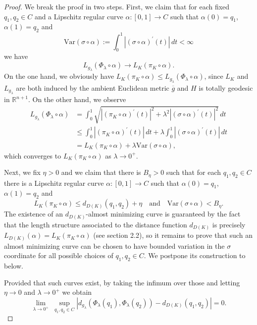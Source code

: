 \documentclass[11pt]{article}
\theoremstyle{definition}
\theoremstyle{remark}
\theoremstyle{plain}
\newcommand{\R}{\mathbb{R}}
\newcommand{\g}{\overline{g}}
\begin{document}
\begin{proof}
  We break the proof in two steps. First, we claim that for each fixed $q_1,q_2\in C$ and a Lipschitz regular curve $\alpha:[0,1]\to C$ such that $\alpha(0)=q_1$, $\alpha(1) = q_2$ and
  $$\mbox{Var}(\sigma\circ \alpha):=\int_0^1|(\sigma\circ \alpha)^\prime(t)|\, dt< \infty$$
  we have 
  $$L_{g_\lambda}(\Phi_\lambda\circ \alpha)\to L_K(\pi_K\circ \alpha).$$
  On the one hand, we obviously have $L_K(\pi_K\circ \alpha)\le L_{g_\lambda}(\Phi_\lambda\circ \alpha)$, since $L_K$ and $L_{g_\lambda}$ are both induced by the ambient Euclidean metric $\g$ and $H$ is totally geodesic in $\R^{n+1}$. On the other hand, we observe
  \begin{equation*}
    \begin{split}
       L_{g_\lambda}(\Phi_\lambda\circ \alpha) & = \int_0^1\sqrt{|(\pi_K\circ \alpha)^\prime(t)|^2 + \lambda^2 |(\sigma\circ \alpha)^\prime(t)|^2}\, dt \\
         & \le \int_0^1|(\pi_K\circ \alpha)^\prime(t)|\, dt + \lambda\int_0^1 |(\sigma\circ \alpha)^\prime(t)|\, dt \\
         & = L_K(\pi_K\circ \alpha) + \lambda\mbox{Var}(\sigma\circ \alpha),
    \end{split}
  \end{equation*}
  which converges to $L_K(\pi_K\circ \alpha)$ as $\lambda\to 0^+$.
  
  Next, we fix $\eta>0$ and we claim that there is $B_\eta>0$ such that for each $q_1,q_2\in C$ there is a Lipschitz regular curve $\alpha:[0,1]\to C$ such that $\alpha(0)=q_1$, $\alpha(1)=q_2$ and
  $$L_K(\pi_K\circ \alpha)\le d_{D(K)}(q_1,q_2)+\eta \quad \mbox{and}\quad \mbox{Var}(\sigma\circ \alpha)<B_\eta.$$
  The existence of an $d_{D(K)}$-almost minimizing curve is guaranteed by the fact that the length structure associated to the distance function $d_{D(K)}$ is precisely $L_{D(K)}(\alpha) = L_K(\pi_K\circ \alpha)$ (see section 2.2), so it remains to prove that such an almost minimizing curve can be chosen to have bounded variation in the $\sigma$ coordinate for all possible choices of $q_1,q_2\in C$. We postpone its construction to  below.

  Provided that such curves exist, by taking the infimum over those and letting $\eta\to 0$ and $\lambda\to 0^+$ we obtain
  $$\lim_{\lambda\to 0^+}\; \sup_{q_1,q_2\in C}|d_{g_\lambda}(\Phi_\lambda(q_1),\Phi_\lambda(q_2))- d_{D(K)}(q_1,q_2)| = 0.$$ 
\end{proof}
\end{document}
